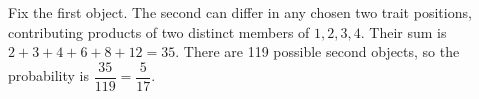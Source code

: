 Fix the first object. The second can differ in any chosen two trait positions, contributing products of two distinct members of $1,2,3,4$. Their sum is $2+3+4+6+8+12=35$. There are 119 possible second objects, so the probability is $\dfrac{35}{119}=\boxed{\dfrac{5}{17}}$.
